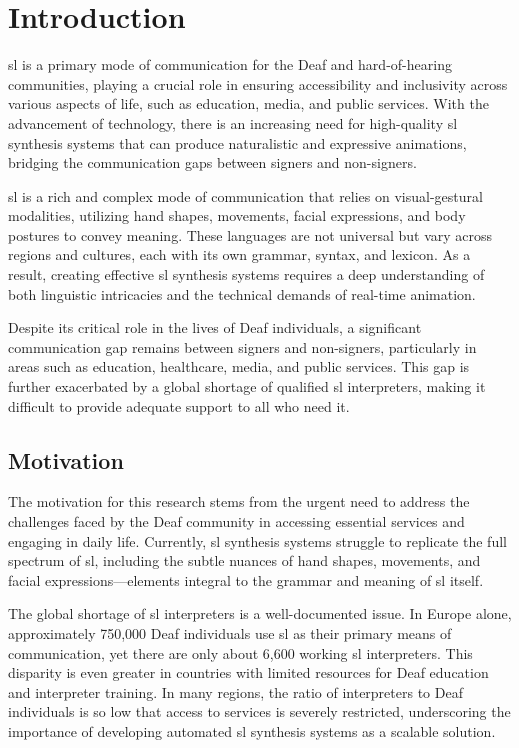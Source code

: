 \documentclass[../../main.tex]{subfiles}
\begin{document}
\chapter{Introduction}
\label{ch:introduction}

\gls{sl} is a primary mode of communication for the Deaf and hard-of-hearing communities, playing a crucial role in ensuring accessibility and inclusivity across various aspects of life, such as education, media, and public services. With the advancement of technology, there is an increasing need for high-quality \gls{sl} synthesis systems that can produce naturalistic and expressive animations, bridging the communication gaps between signers and non-signers. %

\gls{sl} is a rich and complex mode of communication that relies on visual-gestural modalities, utilizing hand shapes, movements, facial expressions, and body postures to convey meaning. These languages are not universal but vary across regions and cultures, each with its own grammar, syntax, and lexicon. As a result, creating effective \gls{sl} synthesis systems requires a deep understanding of both linguistic intricacies and the technical demands of real-time animation.

Despite its critical role in the lives of Deaf individuals, a significant communication gap remains between signers and non-signers, particularly in areas such as education, healthcare, media, and public services. This gap is further exacerbated by a global shortage of qualified \gls{sl} interpreters, making it difficult to provide adequate support to all who need it.

\section{Motivation}
\label{ch:introduction:motivation}

The motivation for this research stems from the urgent need to address the challenges faced by the Deaf community in accessing essential services and engaging in daily life. Currently, \gls{sl} synthesis systems struggle to replicate the full spectrum of \gls{sl}, including the subtle nuances of hand shapes, movements, and facial expressions—elements integral to the grammar and meaning of \gls{sl} itself.

The global shortage of \gls{sl} interpreters is a well-documented issue. In Europe alone, approximately 750,000 Deaf individuals use \gls{sl} as their primary means of communication, yet there are only about 6,600 working \gls{sl} interpreters. This disparity is even greater in countries with limited resources for Deaf education and interpreter training. In many regions, the ratio of interpreters to Deaf individuals is so low that access to services is severely restricted, underscoring the importance of developing automated \gls{sl} synthesis systems as a scalable solution.
\end{document}
